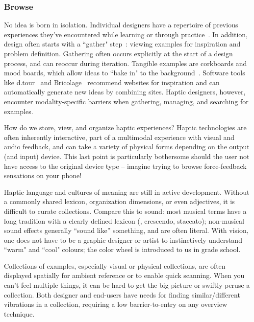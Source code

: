 %
%
\subsubsection{Browse} 
No idea is born in isolation.
Individual designers have a repertoire of previous experiences they've encountered while learning or through practice~\cite{Schon1982}.
In addition, design often starts with a ``gather" step~\cite{Warr2005}: viewing examples for inspiration and problem definition.
Gathering often occurs explicitly at the start of a design process, and can reoccur during iteration.
Tangible examples are corkboards and mood boards, which allow ideas to ``bake in" to the background~\cite{Buxton2007}.
Software tools like d.tour~\cite{Ritchie2011} and Bricolage~\cite{Kumar2011} recommend websites for inspiration and can automatically generate new ideas by combining sites.
Haptic designers, however, encounter modality-specific barriers when gathering, managing, and searching for examples.

    How do we store, view, and organize haptic experiences?
    Haptic technologies are often inherently interactive, part of a multimodal experience with visual and audio feedback, and can take a variety of physical forms depending on the output (and input) device.
    This last point is particularly bothersome should the user not have access to the original device type -- imagine trying to browse force-feedback sensations on your phone!

    Haptic language and cultures of meaning are still in active development.
    Without a commonly shared lexicon, organization dimensions, or even adjectives, it is difficult to curate collections.
    Compare this to sound: most musical terms have a long tradition with a clearly defined lexicon (\eg, crescendo, staccato); non-musical sound effects generally ``sound like'' something, and are often literal.
    With vision, one does not have to be a graphic designer or artist to instinctively understand ``warm" and ``cool" colours; the color wheel is introduced to us in grade school.  
    
    Collections of examples, especially visual or physical collections, are often displayed spatially for ambient reference or to enable quick scanning.
    When you can't feel multiple things, it can be hard to get the big picture or swiftly peruse a collection.
    Both designer and end-users have needs for finding similar/different vibrations in a collection, requiring a low barrier-to-entry on any overview technique.


